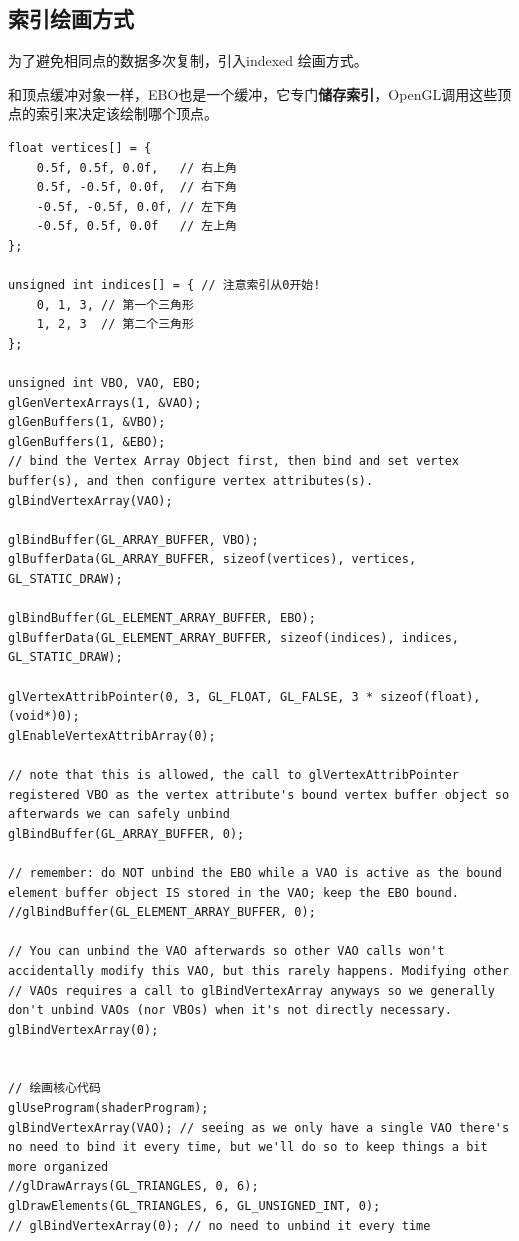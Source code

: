 \documentclass[UTF8,a4paper,12pt]{ctexbook}
\begin{document}
		
		\subsection{索引绘画方式}
			为了避免相同点的数据多次复制，引入indexed 绘画方式。
		
			和顶点缓冲对象一样，EBO也是一个缓冲，它专门\textbf{储存索引}，OpenGL调用这些顶点的索引来决定该绘制哪个顶点。
			
			\begin{lstlisting}
float vertices[] = {
    0.5f, 0.5f, 0.0f,   // 右上角
    0.5f, -0.5f, 0.0f,  // 右下角
    -0.5f, -0.5f, 0.0f, // 左下角
    -0.5f, 0.5f, 0.0f   // 左上角
};

unsigned int indices[] = { // 注意索引从0开始! 
    0, 1, 3, // 第一个三角形
    1, 2, 3  // 第二个三角形
};			
						
unsigned int VBO, VAO, EBO;
glGenVertexArrays(1, &VAO);
glGenBuffers(1, &VBO);
glGenBuffers(1, &EBO);
// bind the Vertex Array Object first, then bind and set vertex buffer(s), and then configure vertex attributes(s).
glBindVertexArray(VAO);

glBindBuffer(GL_ARRAY_BUFFER, VBO);
glBufferData(GL_ARRAY_BUFFER, sizeof(vertices), vertices, GL_STATIC_DRAW);

glBindBuffer(GL_ELEMENT_ARRAY_BUFFER, EBO);
glBufferData(GL_ELEMENT_ARRAY_BUFFER, sizeof(indices), indices, GL_STATIC_DRAW);

glVertexAttribPointer(0, 3, GL_FLOAT, GL_FALSE, 3 * sizeof(float), (void*)0);
glEnableVertexAttribArray(0);

// note that this is allowed, the call to glVertexAttribPointer registered VBO as the vertex attribute's bound vertex buffer object so afterwards we can safely unbind
glBindBuffer(GL_ARRAY_BUFFER, 0); 

// remember: do NOT unbind the EBO while a VAO is active as the bound element buffer object IS stored in the VAO; keep the EBO bound.
//glBindBuffer(GL_ELEMENT_ARRAY_BUFFER, 0);

// You can unbind the VAO afterwards so other VAO calls won't accidentally modify this VAO, but this rarely happens. Modifying other
// VAOs requires a call to glBindVertexArray anyways so we generally don't unbind VAOs (nor VBOs) when it's not directly necessary.
glBindVertexArray(0); 


// 绘画核心代码
glUseProgram(shaderProgram);
glBindVertexArray(VAO); // seeing as we only have a single VAO there's no need to bind it every time, but we'll do so to keep things a bit more organized
//glDrawArrays(GL_TRIANGLES, 0, 6);
glDrawElements(GL_TRIANGLES, 6, GL_UNSIGNED_INT, 0);
// glBindVertexArray(0); // no need to unbind it every time 
			\end{lstlisting}
				
\end{document}
